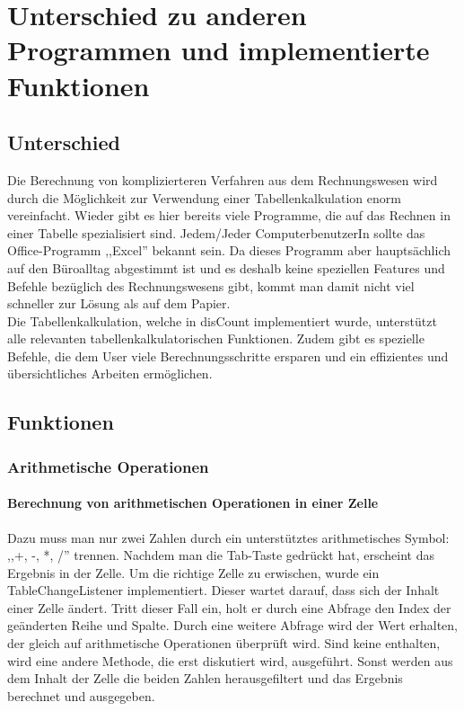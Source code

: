 \documentclass[12pt]{report}
\begin{document}
\chapter{Unterschied zu anderen Programmen und implementierte Funktionen}
\lhead{\thepage}
 
\section{Unterschied}
Die Berechnung von komplizierteren Verfahren aus dem Rechnungswesen wird durch die Möglichkeit zur Verwendung einer Tabellenkalkulation enorm vereinfacht. Wieder gibt es hier bereits viele Programme, die auf das Rechnen in einer Tabelle spezialisiert sind. Jedem/Jeder ComputerbenutzerIn sollte das Office-Programm ,,Excel'' bekannt sein. Da dieses Programm aber hauptsächlich auf den Büroalltag abgestimmt ist und es deshalb keine speziellen Features und Befehle bezüglich des Rechnungswesens gibt, kommt man damit nicht viel schneller zur Lösung als auf dem Papier.\\
Die Tabellenkalkulation, welche in disCount implementiert wurde, unterstützt alle relevanten tabellenkalkulatorischen Funktionen. Zudem gibt es spezielle Befehle, die dem User viele Berechnungsschritte ersparen und ein effizientes und übersichtliches Arbeiten ermöglichen.



\section{Funktionen}

\subsection{Arithmetische Operationen}



\subsubsection{Berechnung von arithmetischen Operationen in einer Zelle}
Dazu muss man nur zwei Zahlen durch ein unterstütztes arithmetisches Symbol: ,,+, -, *, /'' trennen. Nachdem man die Tab-Taste gedrückt hat, erscheint das Ergebnis in der Zelle. Um die richtige Zelle zu erwischen, wurde ein TableChangeListener implementiert. Dieser wartet darauf, dass sich der Inhalt einer Zelle ändert. Tritt dieser Fall ein, holt er durch eine Abfrage den Index der geänderten Reihe und Spalte. Durch eine weitere Abfrage wird der Wert erhalten, der gleich auf arithmetische Operationen überprüft wird. Sind keine enthalten, wird eine andere Methode, die erst diskutiert wird, ausgeführt. Sonst werden aus dem Inhalt der Zelle die beiden Zahlen herausgefiltert und das Ergebnis berechnet und ausgegeben.
\end{document}
